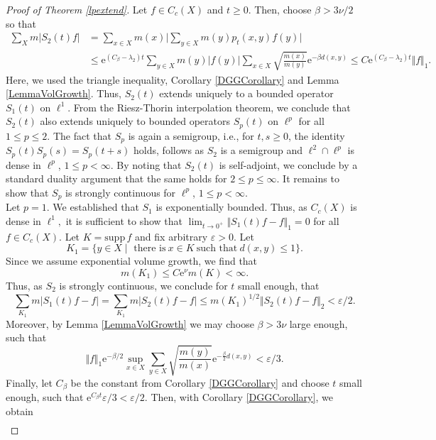 \documentclass[10pt]{amsart}
\theoremstyle{definition}
\begin{document}
\begin{proof}[Proof of Theorem \ref{lpextend}]
    Let $ f\in C_c(X)$ and $t\geq 0.$ Then, choose $\beta>3\nu\slash 2$ so that
    \begin{align*}
        \sum_ X m\vert S_2(t) f\vert &= \sum_{x\in X} m(x)\Big\vert\sum_{y\in X}m(y)p_t(x,y) f(y)\Big\vert\\
        &\leq \mathrm{e}^{(C_\beta-\lambda_2) t}\sum_{y\in X} m(y)\vert f(y)\vert\sum_{x\in X}\sqrt{\frac{m(x)}{m(y)}}\mathrm{e}^{-\beta d(x,y)}\leq C\mathrm{e}^{(C_\beta-\lambda_2) t}\Vert f\Vert_1.
    \end{align*}
Here, we used the triangle inequality, Corollary \ref{DGGCorollary} and Lemma \ref{LemmaVolGrowth}. Thus, $S_2(t)$ extends uniquely to a bounded operator $S_1(t)$ on $\ell^1.$ From the Riesz-Thorin interpolation theorem,  we conclude that $S_2(t)$ also extends uniquely to bounded operators $S_p(t)$ on $\ell^p$ for all $1\leq p\leq 2.$ The fact that $S_p$ is again a semigroup, i.e., for $t,s\geq 0$, the identity $S_p(t)S_p(s) = S_p(t+s)$ holds, follows as $S_2$ is a semigroup and $\ell^2\cap\ell^p$ is dense in $\ell^p$, $1\le p<\infty$. By noting that $S_2(t)$ is self-adjoint, we conclude by a standard duality argument that the same holds for $2\leq p\leq \infty.$  It remains to show that $S_p$ is strongly continuous for $\ell^p$, $1\le p<\infty$. \\
Let $p = 1.$ We established that $S_1$ is exponentially bounded. Thus, as $C_c(X)$ is dense in $\ell^1,$ it is sufficient to show that $\lim_{t\rightarrow0^+}\Vert S_1(t)f-f\Vert_1 = 0$ for all $f\in C_c(X).$ Let $K = \mathrm{supp}\,f$ and fix arbitrary $\varepsilon >0.$ Let 
\[K_1 = \lbrace y\in X\mid \text{ there is}~x\in K~\text{such that}~d(x,y)\leq1\rbrace.\]  
Since we assume exponential volume growth, we find that 
\[m(K_1 )\leq C\mathrm{e}^{\nu}m(K)<\infty.\] Thus, as $S_2$ is strongly continuous, we conclude for $t$ small enough, that 
\[\sum_{K_1}m\vert S_1(t)f-f\vert = \sum_{K_1}m\vert S_2(t)f-f\vert\leq m(K_1)^{1\slash 2}\Vert S_2(t)f-f\Vert_2<\varepsilon\slash 2.\] 
Moreover, by Lemma \ref{LemmaVolGrowth} we may choose  $\beta>3\nu$ large enough, such that 
\[\Vert f\Vert_1\mathrm{e}^{-\beta\slash 2}\sup_{x\in X}\sum_{y\in X}\sqrt{\frac{m(y)}{m(x)}}\mathrm{e}^{-\frac{\beta}{2} d(x,y)}<\varepsilon\slash 3.\]
Finally, let $C_\beta$ be the constant from Corollary \ref{DGGCorollary} and choose $t$ small enough, such that $\mathrm{e}^{C_\beta t}\varepsilon\slash 3<\varepsilon\slash 2.$ Then, with  Corollary \ref{DGGCorollary}, we obtain
\begin{align*}

\end{align*}
\end{proof}
\end{document}
